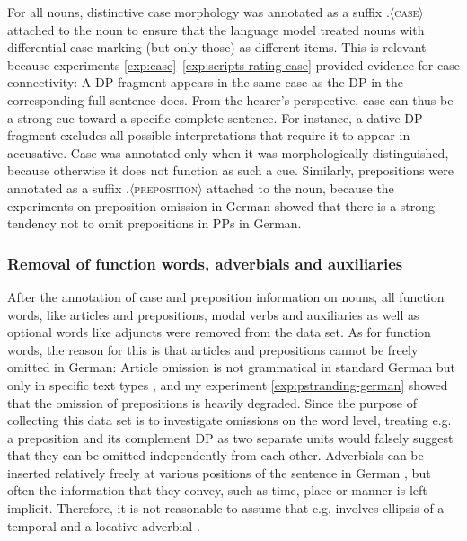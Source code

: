 For all nouns, distinctive case morphology was annotated as a suffix $.\langle$\textsc{case}$\rangle$ attached to the noun to ensure that the language model treated nouns with differential case marking (but only those) as different items. This is relevant because experiments \ref{exp:case}--\ref{exp:scripts-rating-case} provided evidence for case connectivity: A DP fragment appears in the same case as the DP in the corresponding full sentence does. From the hearer's perspective, case can thus be a strong cue toward a specific complete sentence. For instance, a dative DP fragment excludes all possible interpretations that require it to appear in accusative. Case was annotated only when it was morphologically distinguished, because otherwise it does not function as such a cue. Similarly, prepositions were annotated as a suffix $.\langle$\textsc{preposition}$\rangle$ attached to the noun, because the experiments on preposition omission in German showed that there is a strong tendency not to omit prepositions in PPs in German.

\subsubsection{Removal of function words, adverbials and auxiliaries}
After the annotation of case and preposition information on nouns, all function words, like articles and prepositions, modal verbs and auxiliaries as well as optional words like adjuncts were removed from the data set. As for function words, the reason for this is that articles and prepositions cannot be freely omitted in German: Article omission is not grammatical in standard German but only in specific text types \citep{reich2011, reich2017}, and my experiment \ref{exp:pstranding-german} showed that the omission of prepositions is heavily degraded. Since the purpose of collecting this data set is to investigate omissions on the word level, treating e.g. a preposition and its complement DP as two separate units would falsely suggest that they can be omitted independently from each other. Adverbials can be inserted relatively freely at various positions of the sentence in German \citep[209]{eisenberg1999}, but often the information that they convey, such as time, place or manner is left implicit. Therefore, it is not reasonable to assume that e.g. \Next involves ellipsis of a temporal and a locative adverbial \citep[1850]{reich2011}. 

